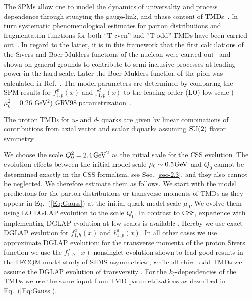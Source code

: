 \documentclass[a4paper]{article}
\begin{document}
The SPMs allow one to model the dynamics of  universality and 
process dependence through studying the gauge-link, and phase content of  
TMDs~\cite{Brodsky:2002cx,Ji:2002aa,Goldstein:2002vv,Metz:2002iz,Gamberg:2003eg,Collins:2004nx,Gamberg:2008yt}.
In turn systematic phenomenological estimates for parton distributions
and fragmentation functions for both ``T-even'' and  ``T-odd'' TMDs 
have been  carried out~\cite{Ji:2002aa,Goldstein:2002vv,Gamberg:2003ey,Boer:2002ju,Gamberg:2007wm,Bacchetta:2008af}. 
In regard to the latter, it is in this framework that the first calculations 
of the Sivers and Boer-Mulders functions of the nucleon were carried
out~\cite{Brodsky:2002cx,Ji:2002aa,Goldstein:2002vv}
and shown on general grounds to contribute to semi-inclusive processes 
at leading power in the hard scale. Later the Boer-Mulders function 
of the pion was calculated in Ref.~\cite{Gamberg:2009uk}. 
The model parameters are determined by comparing the 
SPM results for $f_{1,p}^u(x)$ and $f_{1,p}^d(x)$ 
to the leading order (LO) low-scale ($\mu^{2}_0=0.26$ GeV$^2$) 
GRV98 parametrization~\cite{Gluck:1998xa}.

The proton TMDs for $u$- and $d$- quarks are given by linear
combinations of contributions from axial vector and scalar 
diquarks assuming $\rm SU(2)$ flavor symmetry
\cite{Jakob:1997wg,Gamberg:2007wm}.

We choose the scale
$Q_0^2 = 2.4\,{\rm GeV}^2$
as the initial scale for the CSS evolution.
The evolution effects between the initial model scale $\mu_0\sim 0.5\,{\rm GeV}$ and $Q_0$ cannot be determined 
exactly in the CSS formalism, see Sec.~\ref{sec-2.3}, and they also cannot be neglected. 
We therefore estimate them as follows.  
We start with the model predictions for the parton
distributions or transverse moments of TMDs as they 
appear in Eq.~(\ref{Eq:Gauss}) at the initial quark model 
scale $\mu_0$. We evolve them using LO DGLAP evolution to 
the scale $Q_0$. In contrast to CSS, experience with 
implementing DGLAP evolution at low scales is available \cite{Gluck:1991ng,Gluck:1991ey,Gluck:1994uf,Gluck:1998xa,Gluck:1999xe}. 
Hereby we use exact DGLAP evolution for $f_{1,h}^a(x)$ and $h_{1,p}^a(x)$.
In all other cases we use approximate DGLAP evolution: for the transverse
momenta of the proton Sivers function we use the $f_{1,h}^a(x)$-nonsinglet 
evolution shown to lead good results in the LFCQM model study of SIDIS 
asymmetries \cite{Pasquini:2011tk}, while all chiral-odd TMDs we assume 
the DGLAP evolution of transversity \cite{Hirai:1997mm,Boffi:2009sh}.
For the $k_T$-dependencies of the TMDs we use the same
input from TMD parametrizations as described in Eq.~(\ref{Eq:Gauss}).
\end{document}
